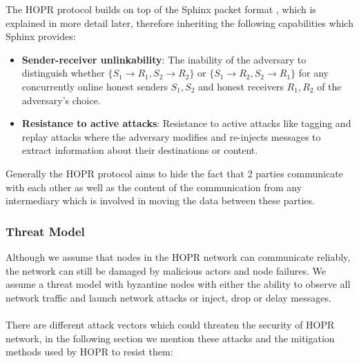 The HOPR protocol builds on top of the Sphinx packet format \cite{sphinxpaper}, which is explained
in more detail later, therefore inheriting the following capabilities which Sphinx provides:

\begin{itemize}

    \item \textbf{Sender-receiver unlinkability}: The inability of the adversary
        to distinguish whether $\{S_1\rightarrow R_1, S_2\rightarrow R_2\}$ or
        $\{S_1\rightarrow R_2, S_2\rightarrow R_1\}$ for any concurrently online
        honest senders $S_1,S_2$ and honest receivers $R_1,R_2$ of the
        adversary’s choice.

    \item \textbf{Resistance to active attacks}: Resistance to active attacks
        like tagging and replay attacks where the adversary modifies and
        re-injects messages to extract information about their destinations or
        content.

\end{itemize}
Generally the HOPR protocol aims to hide the fact that 2 parties
communicate with each other as well as the content of the communication from any
intermediary which is involved in moving the data between these parties.

\subsubsection{Threat Model}

Although we assume that nodes in the HOPR network can communicate reliably, the
network can still be damaged by malicious actors and node failures. We assume a
threat model with byzantine nodes with either the ability to observe all network
traffic and launch network attacks or inject, drop or delay messages. \\~\\There
are different attack vectors which could threaten the security of HOPR network,
in the following section we mention these attacks and the mitigation methods
used by HOPR to resist them:

